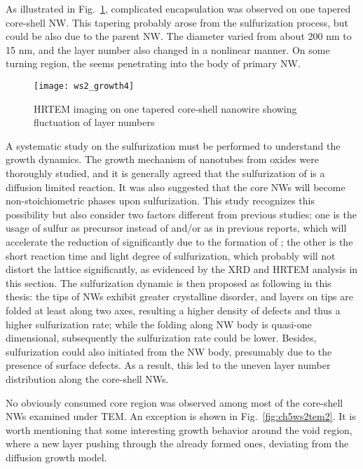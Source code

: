 As illustrated in Fig.~\ref{fig:ch5ws2tem4}, complicated  encapsulation was observed on one tapered core-shell NW. This tapering probably arose from the sulfurization process, but could be also due to the parent  NW. The diameter varied from about 200 nm to 15 nm, and the  layer number also changed in a nonlinear manner. On some turning region, the  seems penetrating into the body of primary  NW. 

\begin{figure}[htb]
\centering
\texttt{[image: ws2\_growth4]}
\caption[TEM imaging on core-shell NWs: 3]{HRTEM imaging on one tapered core-shell nanowire showing fluctuation of layer numbers}
\label{fig:ch5ws2tem4}
\end{figure}


A systematic study on the sulfurization must be performed to understand the growth dynamics. The growth mechanism of  nanotubes from oxides were thoroughly studied,\cite{Feldman1998} and it is generally agreed that the sulfurization of  is a diffusion limited reaction.\cite{Feldman1996} It was also suggested that the core  NWs will become non-stoichiometric phases upon sulfurization.\cite{Feldman1996,ZAK2009} This study recognizes this possibility but also consider two factors different from previous studies: one is the usage of sulfur as precursor instead of  and/or  as in previous reports, which will accelerate the reduction of  significantly due to the formation of ; the other is the short reaction time and light degree of sulfurization, which probably will not distort the  lattice significantly, as evidenced by the XRD and HRTEM analysis in this section. The sulfurization dynamic is then proposed as following in this thesis: the tips of  NWs exhibit greater crystalline disorder, and  layers on tips are folded at least along two axes, resulting a higher density of defects and thus a higher sulfurization rate; while the folding along NW body is quasi-one dimensional, subsequently the sulfurization rate could be lower. Besides, sulfurization could also initiated from the NW body, presumably due to the presence of surface defects. As a result, this led to the uneven  layer number distribution along the core-shell NWs.

No obviously consumed core region was observed among most of the core-shell NWs examined under TEM. An exception is shown in Fig.~\ref{fig:ch5ws2tem2}. It is worth mentioning that some interesting growth behavior around the void region, where a new  layer pushing through the already formed  ones, deviating from the diffusion growth model. 

